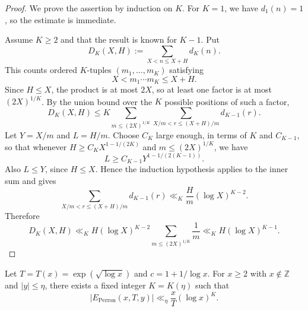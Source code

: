 \begin{proof}
We prove the assertion by induction on $K$. For $K=1$, we have
$d_1(n)=1$, so the estimate is immediate.

Assume $K\geq2$ and that the result is known for $K-1$. Put
\[
    D_K(X,H):=\sum_{X<n\leq X+H}d_K(n).
\]
This counts ordered $K$-tuples $(m_1,\ldots,m_K)$ satisfying
\[
    X<m_1\cdots m_K\leq X+H.
\]
Since $H\leq X$, the product is at most $2X$, so at least one
factor is at most $(2X)^{1/K}$. By the union bound over the
$K$ possible positions of such a factor,
\[
    D_K(X,H)
    \leq
    K\sum_{m\leq(2X)^{1/K}}
    \sum_{X/m<r\leq(X+H)/m}d_{K-1}(r).
\]
Let $Y=X/m$ and $L=H/m$. Choose $C_K$ large enough, in terms of
$K$ and $C_{K-1}$, so that whenever
$H\geq C_KX^{1-1/(2K)}$ and $m\leq(2X)^{1/K}$, we have
\[
    L\geq C_{K-1}Y^{1-1/(2(K-1))}.
\]
Also $L\leq Y$, since $H\leq X$. Hence the induction hypothesis
applies to the inner sum and gives
\[
    \sum_{X/m<r\leq(X+H)/m}d_{K-1}(r)
    \ll_K \frac{H}{m}(\log X)^{K-2}.
\]
Therefore
\[
    D_K(X,H)
    \ll_K
    H(\log X)^{K-2}
    \sum_{m\leq(2X)^{1/K}}\frac1m
    \ll_K H(\log X)^{K-1}.
\]
\end{proof}

\begin{lemma}\label{lem:perron-error}
Let $T=T(x)=\exp(\sqrt{\log x})$ and $c=1+1/\log x$. For
$x\geq2$ with $x\notin\mathbb Z$ and $|y|\leq\eta$, there exists
a fixed integer $K=K(\eta)$ such that
\begin{equation}\label{eq:Eperron-bound}
    |E_{\mathrm{Perron}}(x,T,y)|
    \ll_\eta
    \frac{x}{T}(\log x)^K.
\end{equation}
\end{lemma}

